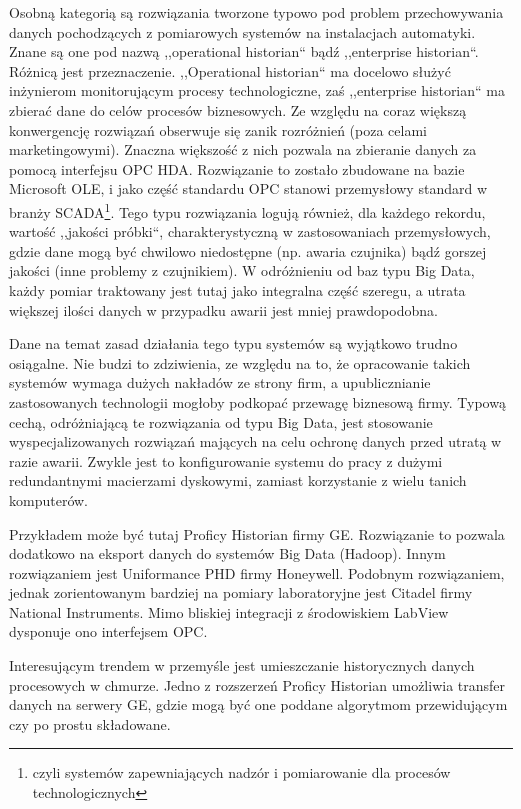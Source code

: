 \documentclass[a4paper,polish,12pt,twoside]{article}
\begin{document}
Osobną kategorią są rozwiązania tworzone typowo pod problem przechowywania danych pochodzących z pomiarowych systemów na instalacjach automatyki. Znane są one pod nazwą ,,operational historian`` bądź ,,enterprise historian``. Różnicą jest przeznaczenie. ,,Operational historian`` ma docelowo służyć inżynierom monitorującym procesy technologiczne, zaś ,,enterprise historian`` ma zbierać dane do celów procesów biznesowych. Ze względu na coraz większą konwergencję rozwiązań obserwuje się zanik rozróżnień (poza celami marketingowymi). Znaczna większość z nich pozwala na zbieranie danych za pomocą interfejsu OPC HDA\cite{opc:hda}. Rozwiązanie to zostało zbudowane na bazie Microsoft OLE, i jako część standardu OPC stanowi przemysłowy standard w branży SCADA\footnote{czyli systemów zapewniających nadzór i pomiarowanie dla procesów technologicznych}. Tego typu rozwiązania logują również, dla każdego rekordu, wartość ,,jakości próbki``, charakterystyczną w zastosowaniach przemysłowych, gdzie dane mogą być chwilowo niedostępne (np. awaria czujnika) bądź gorszej jakości (inne problemy z czujnikiem). W odróżnieniu od baz typu Big Data, każdy pomiar traktowany jest tutaj jako integralna część szeregu, a utrata większej ilości danych w przypadku awarii jest mniej prawdopodobna.

Dane na temat zasad działania tego typu systemów są wyjątkowo trudno osiągalne. Nie budzi to zdziwienia, ze względu na to, że opracowanie takich systemów wymaga dużych nakładów ze strony firm, a upublicznianie zastosowanych technologii mogłoby podkopać przewagę biznesową firmy. Typową cechą, odróżniającą te rozwiązania od typu Big Data, jest stosowanie wyspecjalizowanych rozwiązań mających na celu ochronę danych przed utratą w razie awarii. Zwykle jest to konfigurowanie systemu do pracy z dużymi redundantnymi macierzami dyskowymi, zamiast korzystanie z wielu tanich komputerów.

Przykładem może być tutaj Proficy Historian firmy GE\cite{proficy:historian}. Rozwiązanie to pozwala dodatkowo na eksport danych do systemów Big Data (Hadoop). Innym rozwiązaniem jest Uniformance PHD\cite{uniformance:phd} firmy Honeywell. Podobnym rozwiązaniem, jednak zorientowanym bardziej na pomiary laboratoryjne jest Citadel\cite{ni:citadel} firmy National Instruments. Mimo bliskiej integracji z środowiskiem LabView dysponuje ono interfejsem OPC. 

Interesującym trendem w przemyśle jest umieszczanie historycznych danych procesowych w chmurze\cite{gecloud}. Jedno z rozszerzeń Proficy Historian umożliwia transfer danych na serwery GE, gdzie mogą być one poddane algorytmom przewidującym czy po prostu składowane.
\end{document}
